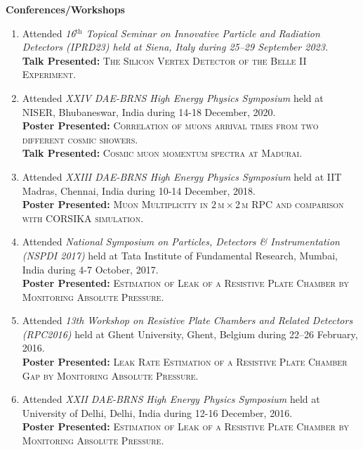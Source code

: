 \documentclass[12pt]{article}
\begin{document}
\newpage

\colorbox{gray!40}{\begin{minipage}{17.5cm}
\bf {Conferences/Workshops} 
\end{minipage} }
\begin{minipage}{1.05\textwidth}
 \vspace{0.4cm}
\begin{enumerate}
  
\item Attended \emph{16$^{\text{th}}$ Topical Seminar on Innovative Particle and Radiation Detectors (IPRD23) held at Siena, Italy during 25--29 September 2023.} \\
  {\bf{Talk Presented:}} \textsc{The Silicon Vertex Detector of the Belle II Experiment}.

\item Attended \emph{XXIV DAE-BRNS High Energy Physics Symposium}  held at NISER, Bhubaneswar, India during 14-18 December, 2020. \\
  {\bf{Poster Presented:}} \textsc{Correlation of muons arrival times from two different cosmic showers}.\\
  {\bf{Talk Presented:}} \textsc{Cosmic muon momentum spectra at Madurai}.

\item Attended \emph{XXIII DAE-BRNS High Energy Physics Symposium}  held at IIT Madras, Chennai, India during 10-14 December, 2018. \\
  {\bf{Poster Presented:}} \textsc{Muon Multiplicity in $2$\,m\,$\times$\,2\,m RPC and comparison with CORSIKA simulation}.

\item Attended \emph{National Symposium on Particles, Detectors \& Instrumentation (NSPDI 2017)} held at Tata Institute of Fundamental Research, Mumbai,  India during 4-7 October, 2017. \\
  {\bf{Poster Presented:}} \textsc{Estimation of Leak of a Resistive Plate Chamber by Monitoring Absolute Pressure}.

\item Attended \emph{13th Workshop on Resistive Plate Chambers and
Related Detectors (RPC2016)} held at Ghent University, Ghent,
  Belgium during 22--26 February, 2016.\\
  {\bf{Poster Presented:}} \textsc{Leak Rate Estimation of a Resistive Plate Chamber Gap by Monitoring Absolute Pressure}.
  
\item Attended \emph{XXII DAE-BRNS High Energy Physics Symposium}  held at University of Delhi, Delhi, India during 12-16 December, 2016. \\
  {\bf{Poster Presented:}} \textsc{Estimation of Leak of a Resistive Plate Chamber by Monitoring Absolute Pressure}.
  

\end{enumerate}
\end{minipage}
\end{document}
